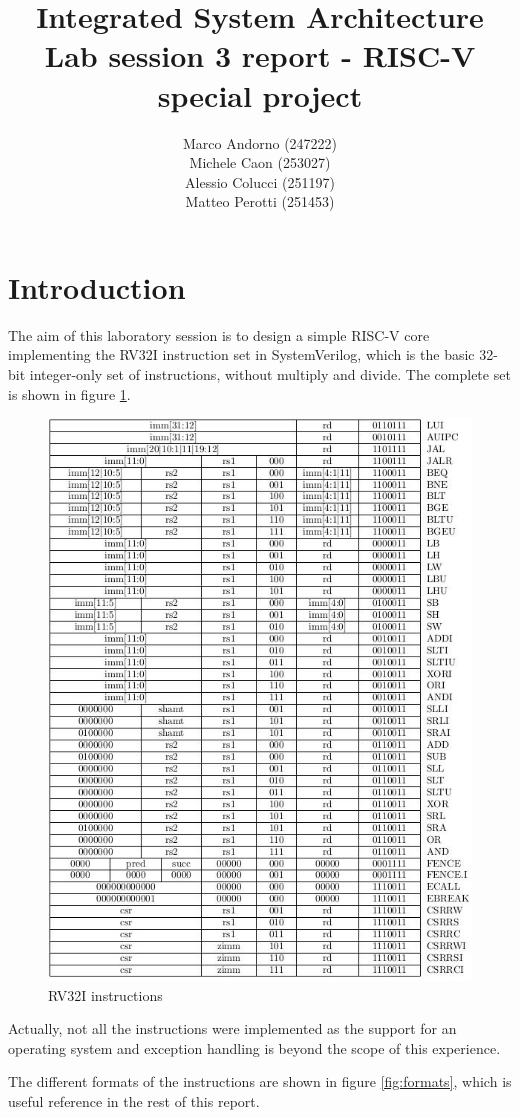 \documentclass[a4paper]{article}
\title{Integrated System Architecture \\ Lab session 3 report - RISC-V special project}
\author{Marco Andorno (247222)\\ Michele Caon (253027) \\ Alessio Colucci (251197) \\ Matteo Perotti (251453)}
\begin{document}
\maketitle
\tableofcontents

\section{Introduction}
The aim of this laboratory session is to design a simple RISC-V core implementing the RV32I instruction set in SystemVerilog, which is the basic 32-bit integer-only set of instructions, without multiply and divide. The complete set is shown in figure \ref{fig:rv32i}.

\begin{figure}[hbtp]
    \centering
    \includegraphics[width=.8\textwidth]{img/RISCV_RV32I_instr2.jpg}
    \caption{RV32I instructions}
    \label{fig:rv32i}
\end{figure}

Actually, not all the instructions were implemented as the support for an operating system and exception handling is beyond the scope of this experience.

The different formats of the instructions are shown in figure \ref{fig:formats}, which is useful reference in the rest of this report.
\end{document}
